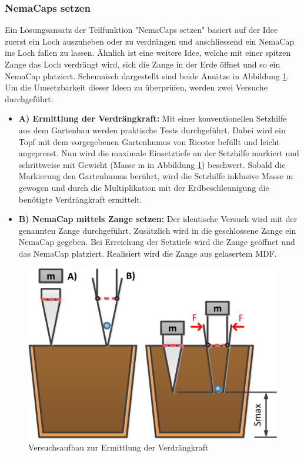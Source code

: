 \subsubsection{NemaCaps setzen}
Ein Lösungsansatz der Teilfunktion "NemaCaps setzen" basiert auf der Idee zuerst ein Loch auszuheben oder zu verdrängen und anschliessend ein NemaCap ins Loch fallen zu lassen. Ähnlich ist eine weitere Idee, welche mit einer spitzen Zange das Loch verdrängt wird, sich die Zange in der Erde öffnet und so ein NemaCap platziert. Schemaisch dargestellt sind beide Ansätze in Abbildung \ref{fig:skizze_setzversuch}.
\newline
Um die Umsetzbarkeit dieser Ideen zu überprüfen, werden zwei Versuche durchgeführt:
\begin{itemize}
	\item \textbf{A) Ermittlung der Verdrängkraft:} Mit einer konventionellen Setzhilfe aus dem Gartenbau werden praktische Tests durchgeführt. Dabei wird ein Topf mit dem vorgegebenen Gartenhumus von Ricoter befüllt und leicht angepresst. Nun wird die maximale Einsetztiefe an der Setzhilfe markiert und schrittweise mit Gewicht (Masse m in Abbildung \ref{fig:skizze_setzversuch}) beschwert. Sobald die Markierung den Gartenhumus berührt, wird die Setzhilfe inklusive Masse m gewogen und durch die Multiplikation mit der Erdbeschleunigung die benötigte Verdrängkraft ermittelt.
	
	\item \textbf{B) NemaCap mittels Zange setzen:} Der identische Versuch wird mit der genannten Zange durchgeführt. Zusätzlich wird in die geschlossene Zange ein NemaCap gegeben. Bei Erreichung der Setztiefe wird die Zange geöffnet und das NemaCap platziert. Realisiert wird die Zange aus gelasertem MDF.
\end{itemize} 

\begin{figure}[H]
	\includegraphics[width=1\textwidth]{Illustrationen/5-Konzept/skizze_stechversuch.PNG}
	\caption{Versuchsaufbau zur Ermittlung der Verdrängkraft}
	\label{fig:skizze_setzversuch}
\end{figure}


